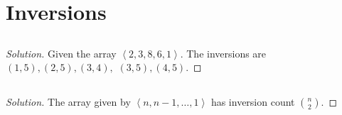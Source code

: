 \documentclass[british,a4paper,]{article}
\theoremstyle{definition}
\newenvironment{soln}{
    \begin{proof}[Solution]
    \renewcommand*{\qedsymbol}{\(\blacksquare\)}
} {
    \end{proof}
}
\begin{document}
\section{Inversions}

\subsection{}

\begin{soln}
    Given the array \(\left\langle 2,3,8,6,1 \right\rangle\).
    The inversions are
    \( (1,5), (2,5), (3,4),\) \((3,5), (4,5) \).
\end{soln}

\subsection{}

\begin{soln}
    The array given by
    \( \left\langle n, n-1, \dots, 1 \right\rangle \)
    has inversion count
    \( \binom{n}{2} \).
\end{soln}

\subsection{}
\end{document}
